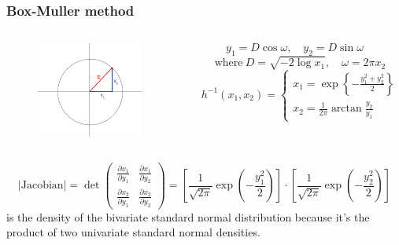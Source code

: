 \documentclass[10pt, serif, mathserif]{beamer}
\begin{document}
\begin{frame}
  \frametitle{Box-Muller method}
  \begin{columns}
    \begin{column}{3cm}
      \begin{figure}
        \centering
        \includegraphics[width=3.5cm,trim=10mm 10mm 10mm 10mm]{images/Picture1.png}
      \end{figure}
    \end{column}

    \begin{column}{5cm}
      \[ y_1 = D \cos \omega, \quad y_2 = D \sin \omega \quad \]
      \[ \text{where}\ D = \sqrt{-2 \log x_1}, \quad \omega = 2\pi x_2 \]
      \medskip
  \[
    h^{-1}(x_1,x_2) = \begin{cases}
      x_1 = \exp{\left\{ -\frac{y_1^2 + y_2^2}{2} \right\}}       
      \\
      x_2 = \frac{1}{2\pi} \arctan \frac{y_2}{y_1}
    \end{cases}
  \]
    \end{column}
  \end{columns}
  
  \bigskip
  
  \[
  	|\text{Jacobian}| = \det \left(
  	  \begin{matrix}
  	    \frac{\partial x_1}{\partial y_1} & \frac{\partial x_1}{\partial y_2} \\
  	    \frac{\partial x_2}{\partial y_1} & \frac{\partial x_2}{\partial y_2} 
  	  \end{matrix}
  	\right) = 
  	\left[ 
  	  \frac{1}{\sqrt{2\pi}} \exp{\left(-\frac{y_1^2}{2}\right)}
  	\right]
  	\cdot
  	\left[
  	  \frac{1}{\sqrt{2\pi}} \exp{\left(-\frac{y_2^2}{2}\right)} 
  	\right]
  \]
  is the density of the bivariate standard normal distribution because it's the product of two univariate standard normal densities.
\end{frame}
\end{document}
